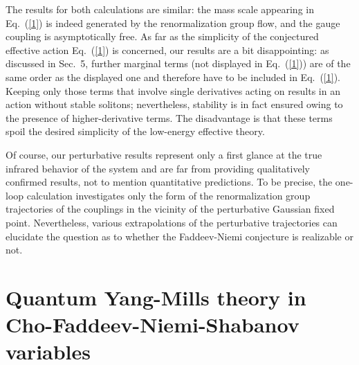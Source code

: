 \documentclass[a4paper,12pt]{article}
\providecommand{\re}[1]{~(\ref{#1})}\usepackage{useful_macros}
\begin{document}
The results for both calculations are similar: the mass scale \coordHE{}
appearing in Eq.\re{1} is indeed generated by the renormalization
group flow, and the gauge coupling is asymptotically free. As far as
the simplicity of the conjectured effective action Eq.\re{1} is
concerned, our results are a bit disappointing: as discussed in
Sec.~5, further marginal terms (not displayed in Eq.\re{1}) are of the
same order as the displayed one and therefore have to be included in
Eq.\re{1}. Keeping only those terms that involve single
derivatives acting on \myHighlight{$\mn$}\coordHE{} results in an action without stable
solitons; nevertheless, stability is in fact ensured owing to the
presence of higher-derivative terms. The disadvantage is that these
terms spoil the desired simplicity of the low-energy effective
theory. 

Of course, our perturbative results represent only a first glance at
the true infrared behavior of the system and are far from providing
qualitatively confirmed results, not to mention quantitative
predictions. To be precise, the one-loop calculation investigates only
the form of the renormalization group trajectories of the couplings in
the vicinity of the perturbative Gaussian fixed point. Nevertheless,
various extrapolations of the perturbative trajectories can elucidate
the question as to whether the Faddeev-Niemi conjecture is realizable
or not.

\section{Quantum Yang-Mills theory in Cho-Faddeev-Niemi-Shabanov
  variables} 
\end{document}

